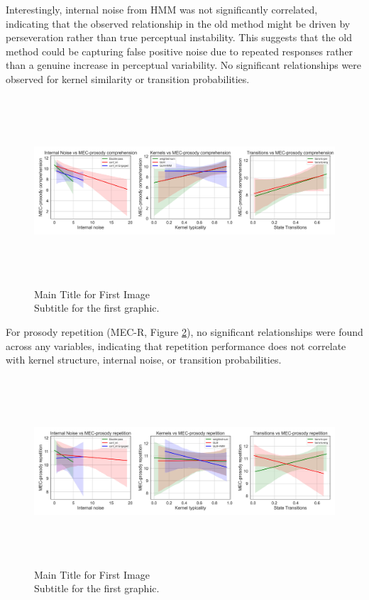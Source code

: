 Interestingly, internal noise from HMM was not significantly correlated, indicating that the observed relationship in the old method might be driven by perseveration rather than true perceptual instability. This suggests that the old method could be capturing false positive noise due to repeated responses rather than a genuine increase in perceptual variability. No significant relationships were observed for kernel similarity or transition probabilities.
\begin{figure}[H]
    \centering
    \includegraphics[width=17cm,height=7cm]{MainLayout/Images/chapter8/regression_results_mec_c.jpg}
    \caption{Main Title for First Image \\ \small Subtitle for the first graphic.}
    \label{fig:regression_results_mec_c}
\end{figure}
For prosody repetition (MEC-R, Figure \ref{fig:regression_results_mec_r}), no significant relationships were found across any variables, indicating that repetition performance does not correlate with kernel structure, internal noise, or transition probabilities.            
\begin{figure}[H]
    \centering
    \includegraphics[width=17cm,height=7cm]{MainLayout/Images/chapter8/regression_results_mec_r.jpg}
    \caption{Main Title for First Image \\ \small Subtitle for the first graphic.}
    \label{fig:regression_results_mec_r}
\end{figure}

